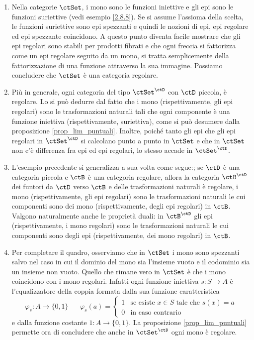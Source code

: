 \begin{examples}\label{esempio_set_reg}
 \hfill
 \begin{enumerate}
  \item Nella categorie \(\ctSet\), i mono sono le funzioni iniettive e gli epi sono le funzioni suriettive (vedi esempio \ref{2.8.8}).
        Se si assume l'assioma della scelta, le funzioni suriettive sono epi spezzanti e quindi le nozioni di epi, epi regolare ed epi
        spezzante coincidono. A questo punto diventa facile mostrare che gli epi regolari sono stabili per prodotti fibrati e che ogni
        freccia si fattorizza come un epi regolare seguito da un mono, si tratta semplicemente della fattorizzazione di una funzione
        attraverso la sua immagine. Possiamo concludere che \(\ctSet\) è una categoria regolare.
  \item Più in generale, ogni categoria del tipo \(\ctSet^{\ctD}\) con \(\ctD\) piccola, è regolare. Lo si può
        dedurre dal fatto che i mono (rispettivamente, gli epi regolari) sono le trasformazioni naturali tali che ogni componente è una
        funzione iniettiva (rispettivamente, suriettiva), come si può desumere dalla proposizione \ref{prop_lim_puntuali}. Inoltre,
        poiché tanto gli epi che gli epi regolari in \(\ctSet^\ctD\) si calcolano punto a punto in \(\ctSet\) e che in \(\ctSet\) non c'è
        differenza fra epi ed epi regolari, lo stesso accade in \(\ctSet^\ctD\).
  \item L'esempio precedente si generalizza a sua volta come segue:; se \(\ctD\) è una categoria piccola e \(\ctB\) è una
        categoria regolare, allora la categoria \(\ctB^{\ctD}\) dei funtori da \(\ctD\) verso \(\ctB\) e delle trasformazioni naturali è regolare,
        i mono (rispettivamente, gli epi regolari) sono le trasformazioni naturali le cui componenti sono dei mono (rispettivamente, degli
        epi regolari) in \(\ctB\). Valgono naturalmente anche le proprietà duali: in \(\ctB^\ctD\) gli epi (rispettivamente, i mono regolari)
        sono le trasformazioni naturali le cui componenti sono degli epi (rispettivamente, dei mono regolari) in \(\ctB\).
  \item Per completare il quadro, osserviamo che in \(\ctSet\) i mono sono spezzanti salvo nel caso in cui il dominio del mono sia
        l'insieme vuoto e il codominio sia un insieme non vuoto. Quello che rimane vero in \(\ctSet\)
        è che i mono coincidono con i mono regolari. Infatti ogni funzione iniettiva
        \(s \colon S \to A\) è l'equalizzatore della coppia formata dalla sua funzione caratteristica
        \[\varphi_s \colon A \to \{0,1\} \;\;\;\;\;\; \varphi_s(a) =
         \left\{\begin{array}{rl} 1 & \mbox{se esiste } x \in S \mbox{ tale che } s(x)=a \\
             0      & \mbox{in caso contrario}\end{array}\right.\]
        e dalla funzione costante \(1 \colon A \to \{0,1\}\).
        La proposizione \ref{prop_lim_puntuali} permette ora di concludere che anche in \(\ctSet^{\ctD}\) ogni mono è regolare.
 \end{enumerate}
\end{examples}

